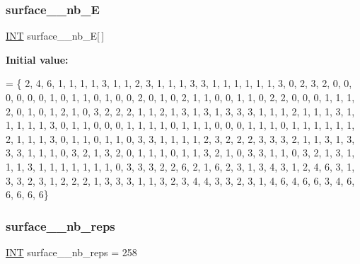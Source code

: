 \mbox{\label{surface__53_8_c_a673a804ef53de3e8cf68143f3de031a9}} 
\subsubsection{\texorpdfstring{surface\+\_\+\_\+nb\+\_\+E}{surface\_53\_nb\_E}}
{\footnotesize\ttfamily \mbox{\hyperlink{galois_8h_a09fddde158a3a20bd2dcadb609de11dc}{I\+NT}} surface\+\_\+\_\+nb\+\_\+E\mbox{[}$\,$\mbox{]}}

{\bfseries Initial value\+:}
\begin{DoxyCode}
= \{ 
    2, 4, 6, 1, 1, 1, 1, 3, 1, 1, 
    2, 3, 1, 1, 1, 3, 3, 1, 1, 1, 
    1, 1, 1, 3, 0, 2, 3, 2, 0, 0, 
    0, 0, 0, 0, 1, 0, 1, 1, 0, 1, 
    0, 0, 2, 0, 1, 0, 2, 1, 1, 0, 
    0, 1, 1, 0, 2, 2, 0, 0, 0, 1, 
    1, 1, 2, 0, 1, 0, 1, 2, 1, 0, 
    3, 2, 2, 2, 1, 1, 2, 1, 3, 1, 
    3, 1, 3, 3, 3, 1, 1, 1, 2, 1, 
    1, 1, 3, 1, 1, 1, 1, 1, 3, 0, 
    1, 1, 0, 0, 0, 1, 1, 1, 1, 0, 
    1, 1, 1, 0, 0, 0, 1, 1, 1, 0, 
    1, 1, 1, 1, 1, 1, 2, 1, 1, 1, 
    3, 0, 1, 1, 0, 1, 1, 0, 3, 3, 
    1, 1, 1, 1, 2, 3, 2, 2, 2, 3, 
    3, 3, 2, 1, 1, 3, 1, 3, 3, 3, 
    1, 1, 1, 0, 3, 2, 1, 3, 2, 0, 
    1, 1, 1, 0, 1, 1, 3, 2, 1, 0, 
    3, 3, 1, 1, 0, 3, 2, 1, 3, 1, 
    1, 1, 3, 1, 1, 1, 1, 1, 1, 1, 
    0, 3, 3, 3, 2, 2, 6, 2, 1, 6, 
    2, 3, 1, 3, 4, 3, 1, 2, 4, 6, 
    3, 1, 3, 3, 2, 3, 1, 2, 2, 2, 
    1, 3, 3, 3, 1, 1, 3, 2, 3, 4, 
    4, 3, 3, 2, 3, 1, 4, 6, 4, 6, 
    6, 3, 4, 6, 6, 6, 6, 6\}
\end{DoxyCode}
\mbox{\label{surface__53_8_c_a8b5bdaaab53b5c72a6c02fbc3b8a3a2e}} 
\subsubsection{\texorpdfstring{surface\+\_\+\_\+nb\+\_\+reps}{surface\_53\_nb\_reps}}
{\footnotesize\ttfamily \mbox{\hyperlink{galois_8h_a09fddde158a3a20bd2dcadb609de11dc}{I\+NT}} surface\+\_\+\_\+nb\+\_\+reps = 258}

